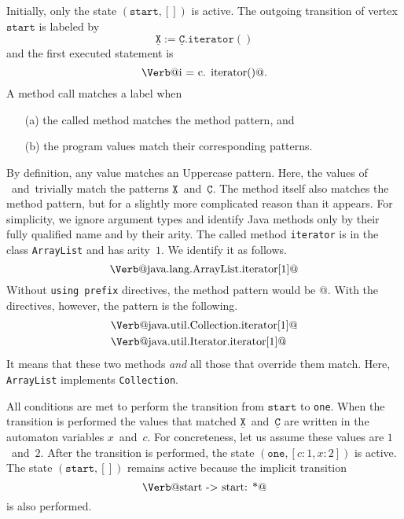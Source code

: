 \documentclass[preprint]{sigplanconf} %
\makeatletter
\newcommand{\pattern}[1]{\ensuremath{\mathtt{\underline{#1}}}}
\newcommand{\start}{\ensuremath{\mathtt{start}}\xspace}
\newcommand{\verbline}[2][]{\[\text{\Verb@#2@}#1\]}
\theoremstyle{definition}
\theoremstyle{remark}
\makeatother
\begin{document}
Initially, only the state $(\start,[])$ is active.
The outgoing transition of vertex \start is labeled by \[\pattern X:=\pattern{C}.\mathtt{iterator}()\] and the first executed statement is \verbline[.]{i = c.\PY{n+na}{iterator}()}
A method call matches a label when
\begin{itemize}
\item[(a)] the called method matches the method pattern, and
\item[(b)] the program values match their corresponding patterns.
\end{itemize}
By definition, any value matches an Uppercase pattern.
Here, the values of \Verb@i@~and~\Verb@c@ trivially match the patterns \pattern X~and~\pattern C.
The method itself also matches the method pattern, but for a slightly more complicated reason than it appears.
For simplicity, we ignore argument types and identify Java methods only by their fully qualified name and by their arity.
The called method \texttt{iterator} is in the class \texttt{ArrayList} and has arity~$1$.
We identify it as follows.
\verbline{java.lang.ArrayList.iterator[1]}
Without \texttt{using prefix} directives, the method pattern would be \Verb@iterator[1]@.
With the directives, however, the pattern is the following.
\begin{align*}
&\text{\Verb@java.util.Collection.iterator[1]@} \\
&\text{\Verb@java.util.Iterator.iterator[1]@}
\end{align*}
It means that these two methods \emph{and} all those that override them match.
Here, \texttt{ArrayList} implements \texttt{Collection}.

All conditions are met to perform the transition from \start to \texttt{one}.
When the transition is performed the values that matched \pattern X~and~\pattern C are written in the automaton variables $x$~and~$c$.
For concreteness, let us assume these values are $1$~and~$2$.
After the transition is performed, the state $(\mathtt{one},[c:1,x:2])$ is active.
The state $(\start,[])$ remains active because the implicit transition \verbline{start -> start: *} is also performed.
\end{document}
